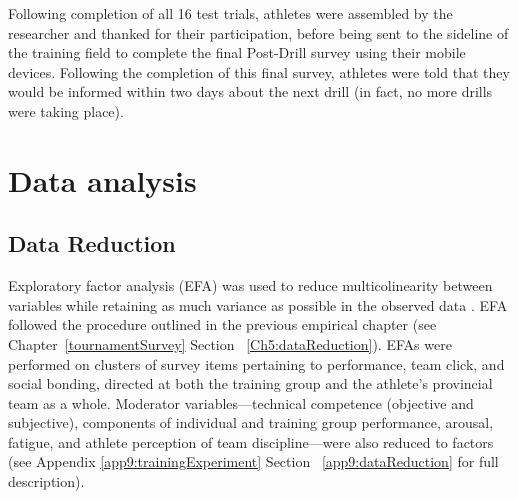 Following completion of all 16 test trials, athletes were assembled by the researcher and thanked for their participation, before being sent to the sideline of the training field to complete the final Post-Drill survey using their mobile devices.  Following the completion of this final survey, athletes were told that they would be informed within two days about the next drill (in fact, no more drills were taking place).



\clearpage
\section{Data analysis}


\subsection{Data Reduction}
Exploratory factor analysis (EFA) was used to reduce multicolinearity between variables while retaining as much variance as possible in the observed data  \citep[, see Appendix ~\ref{app5:EFA}]{Yong2013}. EFA followed the procedure outlined in the previous empirical chapter (see Chapter~\ref{tournamentSurvey} Section ~\ref{Ch5:dataReduction}).
EFAs were performed on clusters of survey items pertaining to performance, team click, and social bonding, directed at both the training group and the athlete's provincial team as a whole.  Moderator variables---technical competence (objective and subjective), components of individual and training group performance, arousal, fatigue, and athlete perception of team discipline---were also reduced to factors (see Appendix \ref{app9:trainingExperiment} Section ~\ref{app9:dataReduction} for full description).

